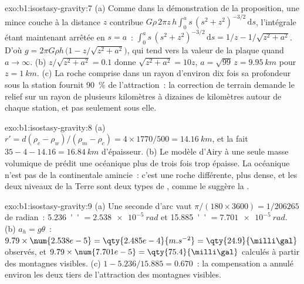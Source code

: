 \begin{solution}{exo:b1:isostasy-gravity:7}
(a) Comme dans la démonstration de la proposition, une mince couche à la distance $z$
contribue $G\rho\,2\pi z\,h\int_0^a s\,(s^2 + z^2)^{-3/2}\,\mathrm ds$, l'intégrale
étant maintenant arrêtée en $s = a$~:
$\int_0^a s\,(s^2 + z^2)^{-3/2}\,\mathrm ds = 1/z - 1/\sqrt{z^2 + a^2}$. D'où
$g = 2\pi G\rho h\,\bigl(1 - z/\sqrt{z^2 + a^2}\bigr)$, qui tend vers la valeur de la
plaque quand $a \to \infty$. (b) $z/\sqrt{z^2 + a^2} = 0.1$ donne
$\sqrt{z^2 + a^2} = 10z$, $a = \sqrt{99}\,z = \qty{9.95}{km}$ pour
$z = \qty{1}{km}$. (c) La roche comprise dans un rayon d'environ dix fois sa profondeur
sous la station fournit \qty{90}{\percent} de l'attraction~: la correction de terrain
demande le relief sur un rayon de plusieurs kilomètres à dizaines de kilomètres
autour de chaque station, et pas seulement sous elle.
\end{solution}

\begin{solution}{exo:b1:isostasy-gravity:8}
(a) $r' = d(\rho_c - \rho_w)/(\rho_m - \rho_c) = 4\times1770/500 =
\qty{14.16}{km}$, et la  fait $35 - 4 - 14.16 = \qty{16.84}{km}$ d'épaisseur.
(b) Le modèle d'Airy à une seule masse volumique de  prédit une  océanique plus de
trois fois trop épaisse. La  océanique n'est pas de la  continentale amincie~: c'est
une roche différente, plus dense, et les deux niveaux de la Terre sont deux types de
, comme le suggère la .
\end{solution}

\begin{solution}{exo:b1:isostasy-gravity:9}
(a) Une seconde d'arc vaut $\pi/(180\times3600) = 1/\num{206265}$ de radian~:
\qty{5.236}{''} $= \qty{2.538e-5}{rad}$ et \qty{15.885}{''} $=
\qty{7.701e-5}{rad}$. (b) $a_h = g\theta$~: $9.79\times\num{2.538e-5} =
\qty{2.485e-4}{m.s^{-2}} = \qty{24.9}{\milli\gal}$ observés, et
$9.79\times\num{7.701e-5} = \qty{75.4}{\milli\gal}$ calculés à partir des montagnes
visibles. (c) $1 - 5.236/15.885 = 0.670$~: la compensation a annulé environ les deux
tiers de l'attraction des montagnes visibles.
\end{solution}

